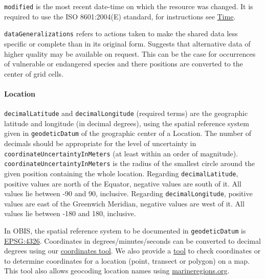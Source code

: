 \documentclass[
  letterpaper,
  DIV=11,
  numbers=noendperiod,
  oneside]{scrreprt}
\let\oldparagraph\paragraph
\renewcommand{\paragraph}[1]{\oldparagraph{#1}\mbox{}}
\begin{document}
\texttt{modified} is the most recent date-time on which the resource was
changed. It is required to use the ISO 8601:2004(E) standard, for
instructions see \protect\hyperlink{time}{Time}.

\texttt{dataGeneralizations} refers to actions taken to make the shared
data less specific or complete than in its original form. Suggests that
alternative data of higher quality may be available on request. This can
be the case for occurrences of vulnerable or endangered species and
there positions are converted to the center of grid cells.

\hypertarget{location}{%
\paragraph{Location}\label{location}}

\texttt{decimalLatitude} and \texttt{decimalLongitude} (required terms)
are the geographic latitude and longitude (in decimal degrees), using
the spatial reference system given in \texttt{geodeticDatum} of the
geographic center of a Location. The number of decimals should be
appropriate for the level of uncertainty in
\texttt{coordinateUncertaintyInMeters} (at least within an order of
magnitude). \texttt{coordinateUncertaintyInMeters} is the radius of the
smallest circle around the given position containing the whole location.
Regarding \texttt{decimalLatitude}, positive values are north of the
Equator, negative values are south of it. All values lie between -90 and
90, inclusive. Regarding \texttt{decimalLongitude}, positive values are
east of the Greenwich Meridian, negative values are west of it. All
values lie between -180 and 180, inclusive.

In OBIS, the spatial reference system to be documented in
\texttt{geodeticDatum} is \href{https://epsg.io/4326}{EPSG:4326}.
Coordinates in degrees/minutes/seconds can be converted to decimal
degrees using our \href{http://iobis.github.io/coordinates/}{coordinates
tool}. We also provide a \href{https://obis.org/maptool}{tool} to check
coordinates or to determine coordinates for a location (point, transect
or polygon) on a map. This tool also allows geocoding location names
using \href{http://www.marineregions.org/}{marineregions.org}.
\end{document}
